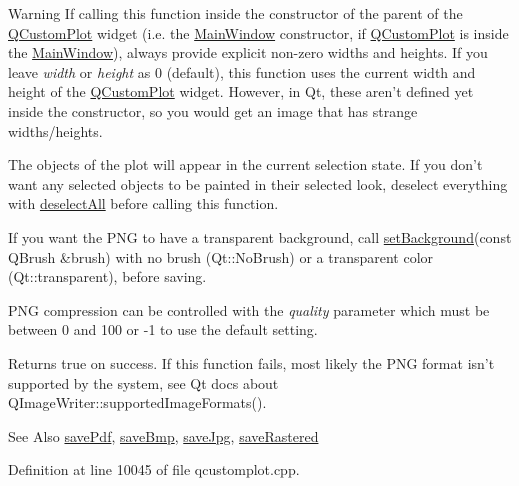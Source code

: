 \begin{DoxyWarning}{Warning}
If calling this function inside the constructor of the parent of the \hyperlink{class_q_custom_plot}{Q\-Custom\-Plot} widget (i.\-e. the \hyperlink{class_main_window}{Main\-Window} constructor, if \hyperlink{class_q_custom_plot}{Q\-Custom\-Plot} is inside the \hyperlink{class_main_window}{Main\-Window}), always provide explicit non-\/zero widths and heights. If you leave {\itshape width} or {\itshape height} as 0 (default), this function uses the current width and height of the \hyperlink{class_q_custom_plot}{Q\-Custom\-Plot} widget. However, in Qt, these aren't defined yet inside the constructor, so you would get an image that has strange widths/heights.
\end{DoxyWarning}
The objects of the plot will appear in the current selection state. If you don't want any selected objects to be painted in their selected look, deselect everything with \hyperlink{class_q_custom_plot_a9d4808ab925b003054085246c92a257c}{deselect\-All} before calling this function.

If you want the P\-N\-G to have a transparent background, call \hyperlink{class_q_custom_plot_a130358592cfca353ff3cf5571b49fb00}{set\-Background}(const Q\-Brush \&brush) with no brush (Qt\-::\-No\-Brush) or a transparent color (Qt\-::transparent), before saving.

P\-N\-G compression can be controlled with the {\itshape quality} parameter which must be between 0 and 100 or -\/1 to use the default setting.

Returns true on success. If this function fails, most likely the P\-N\-G format isn't supported by the system, see Qt docs about Q\-Image\-Writer\-::supported\-Image\-Formats().

\begin{DoxySeeAlso}{See Also}
\hyperlink{class_q_custom_plot_a84e33ad7492180f20ff520e557ed102d}{save\-Pdf}, \hyperlink{class_q_custom_plot_a6629d9e8e6da4bf18055ee0257fdce9a}{save\-Bmp}, \hyperlink{class_q_custom_plot_a490c722092d1771e8ce4a7a73dfd84ab}{save\-Jpg}, \hyperlink{class_q_custom_plot_ab528b84cf92baabe29b1d0ef2f77c93e}{save\-Rastered} 
\end{DoxySeeAlso}


Definition at line 10045 of file qcustomplot.\-cpp.

